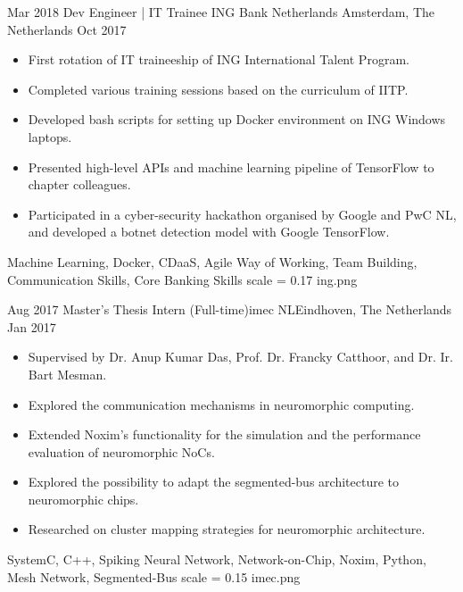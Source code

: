 \begin{experiences}
	\experience
	{Mar 2018} {Dev Engineer | IT Trainee} {ING Bank Netherlands} {Amsterdam, The Netherlands}
	{Oct 2017}{
					\begin{itemize}
						\item First rotation of IT traineeship of ING International Talent Program.
						\item Completed various training sessions based on the curriculum of IITP.
						\item Developed bash scripts for setting up Docker environment on ING Windows laptops.  
						\item Presented high-level APIs and machine learning pipeline of TensorFlow to chapter colleagues.
						\item Participated in a cyber-security hackathon organised by Google and PwC NL, and developed a botnet detection model with Google TensorFlow.
				\end{itemize}}
			{Machine Learning, Docker, CDaaS, Agile Way of Working, Team Building, Communication Skills, Core Banking Skills}
		{scale = 0.17}		{ing.png} 
		
	\emptySeparator
	
	
	\experience
    {Aug 2017}	{Master's Thesis Intern (Full-time)}{imec NL}{Eindhoven, The Netherlands}
    {Jan 2017}	{
    				\begin{itemize}
                    	\item Supervised by Dr. Anup Kumar Das, Prof. Dr. Francky Catthoor, and Dr. Ir. Bart Mesman.
    					\item Explored the communication mechanisms in neuromorphic computing.
                        \item Extended Noxim's functionality for the simulation and the performance evaluation of neuromorphic NoCs.
                        \item Explored the possibility to adapt the segmented-bus architecture to neuromorphic chips. 
                        \item Researched on cluster mapping strategies for neuromorphic architecture.
    				\end{itemize}
    			}
                {SystemC, C++, Spiking Neural Network, Network-on-Chip, Noxim, Python, Mesh Network, Segmented-Bus}
     {scale = 0.15}		{imec.png} 
	\emptySeparator
    

\end{experiences}
